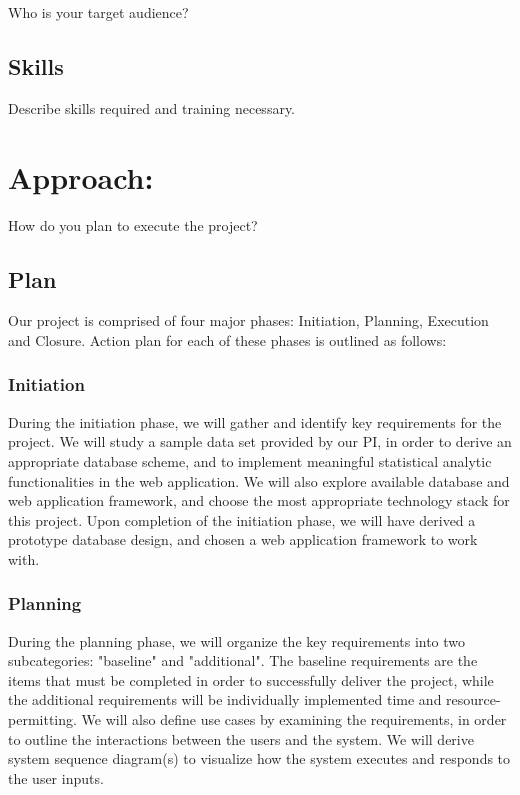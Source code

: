 \documentclass[10pt,twocolumn,letterpaper]{article}
\begin{document}
            Who is your target audience?

            \subsection{Skills}

            Describe skills required and training necessary.

	   	\section{Approach:}

        How do you plan to execute the project? 

            \subsection{Plan}
            Our project is comprised of four major phases: Initiation, Planning, Execution and Closure. Action plan for each of these phases is outlined as follows:
                \subsubsection{Initiation}
                During the initiation phase, we will gather and identify key requirements for the project. We will study a sample data set provided by our PI, in order to derive an appropriate database scheme, and to implement meaningful statistical analytic functionalities in the web application. We will also explore available database and web application framework, and choose the most appropriate technology stack for this project. Upon completion of the initiation phase, we will have derived a prototype database design, and chosen a web application framework to work with.
                \subsubsection{Planning}
                During the planning phase, we will organize the key requirements into two subcategories: "baseline" and "additional". The baseline requirements are the items that must be completed in order to successfully deliver the project, while the additional requirements will be individually implemented time and resource-permitting. We will also define use cases by examining the requirements, in order to outline the interactions between the users and the system. We will derive system sequence diagram(s) to visualize how the system executes and responds to the user inputs.
\end{document}
